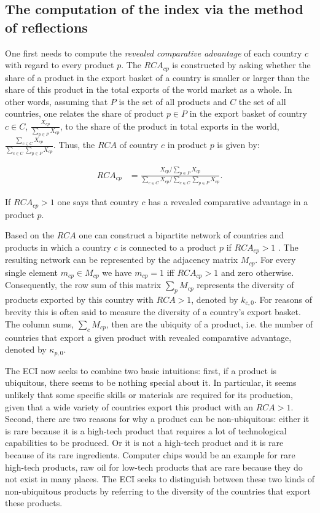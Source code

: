\documentclass[11pt,a4paper]{article}
\begin{document}
\subsection{The computation of the index via the method of reflections}

One first needs to compute the \textit{revealed comparative advantage} of each country $c$ with regard to every product $p$.
The $RCA_{cp}$ is constructed by asking whether the share of a product in the export basket of a country is smaller or larger than the share of this product in the total exports of the world market as a whole.
In other words, assuming that $P$ is the set of all products and $C$ the set of all countries, one relates the share of product $p\in P$ in the export basket of country $c\in C$, $\frac{X_{cp}}{\sum_{p\in P}X_{cp}}$, to the share of the product in total exports in the world, $\frac{\sum_{c\in C}X_{cp}}{\sum_{c\in C}\sum_{p\in P}X_{cp}}$.
Thus, the $RCA$ of country $c$ in product $p$ is given by:

\begin{align}
RCA_{cp}&=\frac{X_{cp} / \sum_{p\in P}X_{cp}}{\sum_{c\in C}X_{cp}/\sum_{c\in C}\sum_{p\in P}X_{cp}}.
\end{align}

If $RCA_{cp}>1$ one says that country $c$ has a revealed comparative advantage in a product $p$.

Based on the $RCA$ one can construct a bipartite network of countries and products in which a country $c$ is connected to a product $p$ if $RCA_{cp}>1$ \citep{Hidalgo:2007cp}. 
The resulting network can be represented by the adjacency matrix $M_{cp}$.
For every single element $m_{cp}\in M_{cp}$ we have $m_{cp} = 1$ iff $RCA_{cp}>1$ and zero otherwise.
Consequently, the row sum of this matrix $\sum_pM_{cp}$ represents the diversity of products exported by this country with $RCA>1$, denoted by $k_{c,0}$. For reasons of brevity this is often said to measure the diversity of a country's export basket.
The column sums, $\sum_cM_{cp}$, then are the ubiquity of a product, i.e. the number of countries that export a given product with revealed comparative advantage, denoted by $\kappa_{p,0}$.

The ECI now seeks to combine two basic intuitions: first, if a product is ubiquitous, there seems to be nothing special about it. In particular, it seems unlikely that some specific skills or materials are required for its production, given that a wide variety of countries export this product with an $RCA>1$. Second, there are two reasons for why a product can be non-ubiquitous: either it is rare because it is a high-tech product that requires a lot of technological capabilities to be produced. Or it is not a high-tech product and it is rare because of its rare ingredients. Computer chips would be an example for rare high-tech products, raw oil for low-tech products that are rare because they do not exist in many places. The ECI seeks to distinguish between these two kinds of non-ubiquitous products by referring to the diversity of the countries that export these products.
\end{document}
